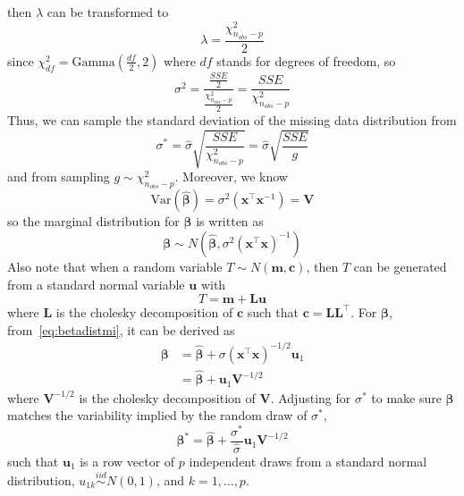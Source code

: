 then $\lambda$ can be transformed to
\begin{equation} 
    \lambda = \frac{\chi^2_{n_{obs}-p}}{2}
\end{equation}
since $\chi^2_{df}=\text{Gamma}(\frac{df}{2},2)$ where $df$ stands for degrees of freedom, so 
\begin{equation} 
    \sigma^2=\frac{\frac{SSE}{2}}{\frac{\chi^2_{n_{obs}-p}}{2}}=\frac{SSE}{\chi^2_{n_{obs}-p}}
\end{equation}
Thus, we can sample the standard deviation of the missing data distribution from 
\begin{equation} 
    \sigma^*=\hat{\sigma}\sqrt{\frac{SSE}{\chi^2_{n_{obs}-p}}}=\hat{\sigma}\sqrt{\frac{SSE}{g}}
\end{equation}
and from sampling $g\sim \chi^2_{n_{obs}-p}$. 
Moreover, we know 
\begin{equation} 
    \text{Var}(\hat{\boldsymbol{\beta}})=\sigma^2(\mathbf{x}^{\top}\mathbf{x}^{-1})=\mathbf{V}
\end{equation}
so the marginal distribution for $\boldsymbol{\beta}$ is written as 
\begin{equation}\label{eq:betadistmi}
    \boldsymbol{\beta}\sim N(\hat{\boldsymbol{\beta}}, \sigma^2(\mathbf{x}^{\top}\mathbf{x})^{-1})
\end{equation}
Also note that when a random variable $T\sim N(\mathbf{m}, \mathbf{c})$, then $T$ can be generated from a standard normal variable $\mathbf{u}$ with 
\begin{equation} 
    T=\mathbf{m}+\mathbf{L}\mathbf{u}
\end{equation}
where $\mathbf{L}$ is the cholesky decomposition of $\mathbf{c}$ such that $\mathbf{c}=\mathbf{L}\mathbf{L}^{\top}$.
For $\boldsymbol{\beta}$, from~\ref{eq:betadistmi}, it can be derived as 
\begin{align} 
    \boldsymbol{\beta}&=\hat{\boldsymbol{\beta}}+\sigma ( \mathbf{x}^{\top}\mathbf{x} )^{-1/2}\mathbf{u}_1\\
    &=\hat{\boldsymbol{\beta}}+\mathbf{u}_1\mathbf{V}^{-1/2}
\end{align}
where $\mathbf{V}^{-1/2}$ is the cholesky decomposition of $\mathbf{V}$. 
Adjusting for $\sigma^*$ to make sure $\boldsymbol{\beta}$ matches the variability implied by the random draw of $\sigma^*$, 
\begin{equation} 
    \boldsymbol{\beta}^*=\hat{\boldsymbol{\beta}}+\frac{\sigma^*}{\hat{\sigma}}\mathbf{u}_1\mathbf{V}^{-1/2}
\end{equation}
such that $\mathbf{u}_1$ is a row vector of $p$ independent draws from a standard normal distribution, $u_{1k}\stackrel{iid}{\sim} N(0,1)$, and $k=1,\ldots,p$. 
